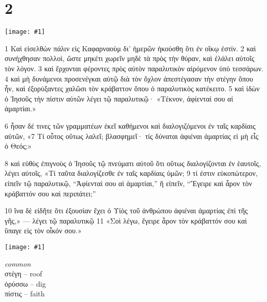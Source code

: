 \documentclass[10pt,a5paper,twoside,twocolumn]{book}
\newcommand{\fig}[1]{\texttt{[image: \#1]}\label{fig:#1}}
\newcommand*\cleartoleftpage{%
  \ifodd\value{page}\hbox{}\clearpage\fi
}
\newenvironment{facing}{\cleartoleftpage}{\clearpage\pagebreak}
\newenvironment{help}{\pagebreak}{}
\newenvironment{helpsec}{\begin{minipage}[t]{\textwidth}\begin{multicols}{2}}{\end{multicols}\end{minipage}}
\newenvironment{vocab}{\begin{helpsec}}{\end{helpsec}}
\begin{document}

\chapter{2}

\begin{facing}

\fig{02-04} %

	1 Καὶ εἰσελθὼν πάλιν εἰς Καφαρναοὺμ δι’ ἡμερῶν ἠκούσθη ὅτι ἐν οἴκῳ ἐστίν. 2 καὶ συνήχθησαν πολλοὶ, ὥστε μηκέτι χωρεῖν μηδὲ τὰ πρὸς τὴν θύραν, καὶ ἐλάλει αὐτοῖς τὸν λόγον. 3 καὶ ἔρχονται φέροντες πρὸς αὐτὸν παραλυτικὸν αἰρόμενον ὑπὸ τεσσάρων. 4 καὶ μὴ δυνάμενοι προσενέγκαι αὐτῷ διὰ τὸν ὄχλον ἀπεστέγασαν τὴν στέγην ὅπου ἦν, καὶ ἐξορύξαντες χαλῶσι τὸν κράβαττον ὅπου ὁ παραλυτικὸς κατέκειτο. 
5 καὶ ἰδὼν ὁ Ἰησοῦς τὴν πίστιν αὐτῶν λέγει τῷ παραλυτικῷ· «Τέκνον, ἀφίενταί σου αἱ ἁμαρτίαι.»

 6 ἦσαν δέ τινες τῶν γραμματέων ἐκεῖ καθήμενοι καὶ διαλογιζόμενοι ἐν ταῖς καρδίαις αὐτῶν, «7 Τί οὗτος οὕτως λαλεῖ; βλασφημεῖ· τίς δύναται ἀφιέναι ἁμαρτίας εἰ μὴ εἷς ὁ Θεός;»

8 καὶ εὐθὺς ἐπιγνοὺς ὁ Ἰησοῦς τῷ πνεύματι αὐτοῦ ὅτι οὕτως διαλογίζονται ἐν ἑαυτοῖς, λέγει αὐτοῖς, «Τί ταῦτα διαλογίζεσθε ἐν ταῖς καρδίαις ὑμῶν; 
9 τί ἐστιν εὐκοπώτερον, εἰπεῖν τῷ παραλυτικῷ, ``Ἀφίενταί σου αἱ ἁμαρτίαι,'' ἢ εἰπεῖν, ``Ἔγειρε καὶ ἆρον τὸν κράβαττόν σου καὶ περιπάτει;''

10 ἵνα δὲ εἰδῆτε ὅτι ἐξουσίαν ἔχει ὁ Υἱὸς τοῦ ἀνθρώπου ἀφιέναι ἁμαρτίας ἐπὶ τῆς γῆς,» — λέγει τῷ παραλυτικῷ 11 «Σοὶ λέγω, ἔγειρε ἆρον τὸν κράβαττόν σου καὶ ὕπαγε εἰς τὸν οἶκόν σου.»

\fig{02-06} %



\begin{help}
\begin{vocab}

\emph{common}\\
στέγη -- roof \\
ὀρύσσω -- dig \\
πίστις -- faith \\


\end{vocab}
\end{help}
\end{facing}
\end{document}
